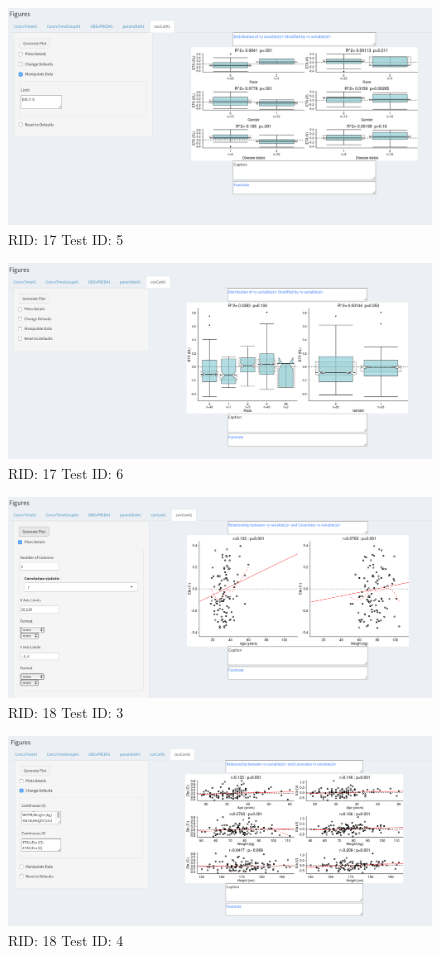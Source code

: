 \begin{figure}[H]
\includegraphics[width=.8\textwidth]{screencaps/17-5-1.png}
\caption{RID: 17 Test ID: 5}
\end{figure}
\begin{figure}[H]
\includegraphics[width=.8\textwidth]{screencaps/17-6-1.png}
\caption{RID: 17 Test ID: 6}
\end{figure}
\begin{figure}[H]
\includegraphics[width=.8\textwidth]{screencaps/18-3-1.png}
\caption{RID: 18 Test ID: 3}
\end{figure}
\begin{figure}[H]
\includegraphics[width=.8\textwidth]{screencaps/18-4-1.png}
\caption{RID: 18 Test ID: 4}
\end{figure}
